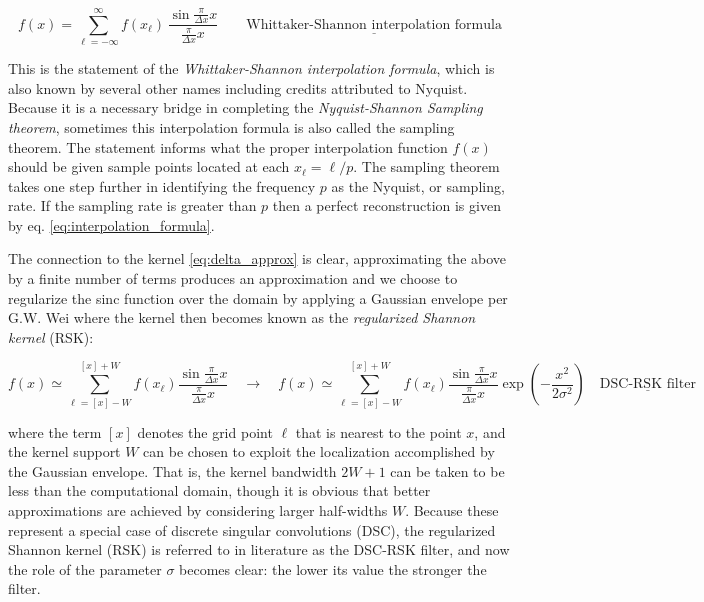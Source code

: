 \documentclass[11pt,titlepage]{report}
\begin{document}
\begin{equation}\boxed{f(x) = \sum_{\ell = -\infty}^{\infty} f(x_{\ell})\, \frac{\sin \tfrac{\pi}{\Delta x}x}{\tfrac{\pi}{\Delta x} x}} \qquad \underline{\text{Whittaker-Shannon interpolation formula}\label{eq:interpolation_formula}}\end{equation}

\noindent This is the statement of the \emph{Whittaker-Shannon interpolation formula}, which is also known by several other names including credits attributed to Nyquist. Because it is a necessary bridge in completing the \emph{Nyquist-Shannon Sampling theorem}, sometimes this interpolation formula is also called the sampling theorem. The statement informs what the proper interpolation function $f(x)$ should be given sample points located at each $x_{\ell} =  \ell / p$. The sampling theorem takes one step further in identifying the frequency $p$ as the Nyquist, or sampling, rate. If the sampling rate is greater than $p$ then a perfect reconstruction is given by eq. \eqref{eq:interpolation_formula}. 

The connection to the kernel \eqref{eq:delta_approx} is clear, approximating the above by a finite number of terms produces an approximation and we choose to regularize the sinc function over the domain by applying a Gaussian envelope per G.W. Wei \cite{Wei99} where the kernel then becomes known as the \emph{regularized Shannon kernel} (RSK):

\begin{equation}f(x) \simeq \sum_{\ell = [x] - W}^{[x] + W} f(x_{\ell}) \frac{\sin \tfrac{\pi}{\Delta x}x}{\tfrac{\pi}{\Delta x} x} \quad \rightarrow \quad \boxed{f(x) \simeq \sum_{\ell = [x] - W}^{[x] + W} f(x_{\ell}) \frac{\sin \tfrac{\pi}{\Delta x}x}{\tfrac{\pi}{\Delta x} x}\exp \left(-\frac{x^2}{2\sigma^2}\right)} \quad \underline{\text{DSC-RSK filter}}\end{equation}

\noindent where the term $[x]$ denotes the grid point $\ell$ that is nearest to the point $x$, and the kernel support $W$ can be chosen to exploit the localization accomplished by the Gaussian envelope. That is, the kernel bandwidth $2W + 1$ can be taken to be less than the computational domain, though it is obvious that better approximations are achieved by considering larger half-widths $W$. Because these represent a special case of discrete singular convolutions (DSC), the regularized Shannon kernel (RSK) is referred to in literature as the DSC-RSK filter, and now the role of the parameter $\sigma$ becomes clear: the lower its value the stronger the filter. 
\end{document}
